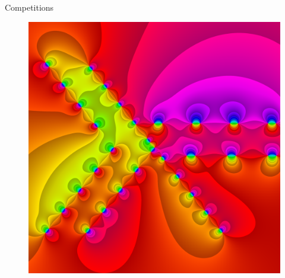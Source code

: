 \documentclass{beamer}
\begin{document}
\begin{frame}[fragile]{Competitions}
{\begin{figure}
\includegraphics[height=0.85\textheight]{assets/creativity}
\end{figure}
}
\end{frame}
\end{document}
